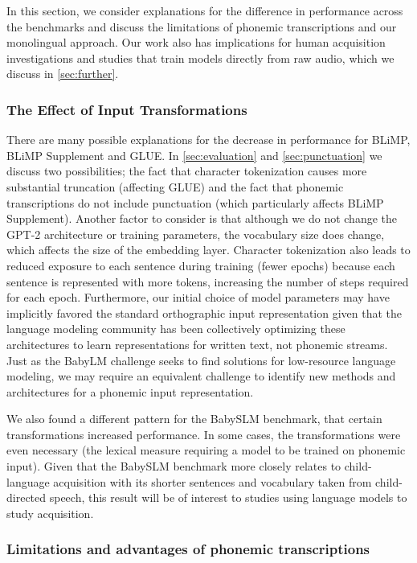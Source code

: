 In this section, we consider explanations for the difference in performance across the benchmarks and discuss the limitations of phonemic transcriptions and our monolingual approach. Our work also has implications for human acquisition investigations and studies that train models directly from raw audio, which we discuss in \cref{sec:further}.

\subsubsection{The Effect of Input Transformations}

There are many possible explanations for the decrease in performance for BLiMP, BLiMP Supplement and GLUE. In \cref{sec:evaluation} and \cref{sec:punctuation} we discuss two possibilities; the fact that character tokenization causes more substantial truncation (affecting GLUE) and the fact that phonemic transcriptions do not include punctuation (which particularly affects BLiMP Supplement). Another factor to consider is that although we do not change the GPT-2 architecture or training parameters, the vocabulary size does change, which affects the size of the embedding layer. Character tokenization also leads to reduced exposure to each sentence during training (fewer epochs) because each sentence is represented with more tokens, increasing the number of steps required for each epoch. Furthermore, our initial choice of model parameters may have implicitly favored the standard orthographic input representation given that the language modeling community has been collectively optimizing these architectures to learn representations for written text, not phonemic streams. Just as the BabyLM challenge seeks to find solutions for low-resource language modeling, we may require an equivalent challenge to identify new methods and architectures for a phonemic input representation. 

We also found a different pattern for the BabySLM benchmark, that certain transformations increased performance. In some cases, the transformations were even necessary (the lexical measure requiring a model to be trained on phonemic input). Given that the BabySLM benchmark more closely relates to child-language acquisition with its shorter sentences and vocabulary taken from child-directed speech, this result will be of interest to studies using language models to study acquisition.

\subsubsection{Limitations and advantages of phonemic transcriptions}
\label{sec:phonemeslimitations}

